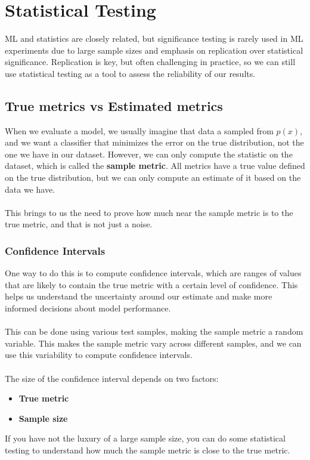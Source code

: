 \section{Statistical Testing}%
ML and statistics are closely related, but significance testing is rarely used in ML experiments due to large sample sizes and emphasis on replication over statistical significance.
Replication is key, but often challenging in practice, so we can still use statistical testing as a tool to assess the reliability of our results.

\subsection{True metrics vs Estimated metrics}
When we evaluate a model, we usually imagine that data a sampled from $p(x)$, and we want a classifier that minimizes the error on the true distribution, not the one we have in our dataset.
However, we can only compute the statistic on the dataset, which is called the \textbf{sample metric}.
All metrics have a true value defined on the true distribution, but we can only compute an estimate of it based on the data we have.
\\\\
This brings to us the need to prove how much near the sample metric is to the true metric, and that is not just a noise.

\subsubsection{Confidence Intervals}
One way to do this is to compute confidence intervals, which are ranges of values that are likely to contain the true metric with a certain level of confidence.
This helps us understand the uncertainty around our estimate and make more informed decisions about model performance.
\\\\
This can be done using various test samples, making the sample metric a random variable.
This makes the sample metric vary across different samples, and we can use this variability to compute confidence intervals.
\\\\
The size of the confidence interval depends on two factors:
\begin{itemize}
    \item \textbf{True metric}
    \item \textbf{Sample size}
\end{itemize}
If you have not the luxury of a large sample size, you can do some statistical testing to understand how much the sample metric is close to the true metric.

